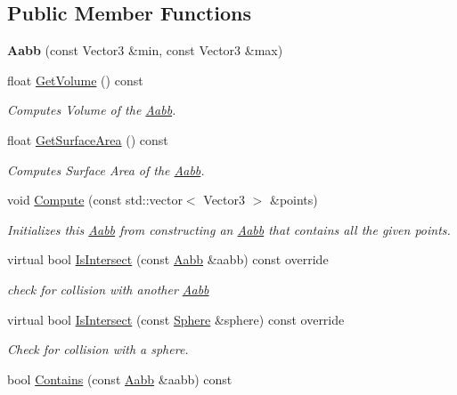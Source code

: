 \subsection*{Public Member Functions}
\begin{DoxyCompactItemize}
\item 
\mbox{\label{classAabb_a03899715c47e17287f251dc325ebd477}} 
{\bfseries Aabb} (const Vector3 \&min, const Vector3 \&max)
\item 
float \hyperlink{classAabb_ad0f21e16f7be2c42839b0cb025eeed9f}{Get\+Volume} () const
\begin{DoxyCompactList}\small\item\em Computes Volume of the \hyperlink{classAabb}{Aabb}. \end{DoxyCompactList}\item 
float \hyperlink{classAabb_aa5c6fea4dcb0a7f9640a72b1babfe192}{Get\+Surface\+Area} () const
\begin{DoxyCompactList}\small\item\em Computes Surface Area of the \hyperlink{classAabb}{Aabb}. \end{DoxyCompactList}\item 
void \hyperlink{classAabb_a57f19da16237a3e73ba246bd9a20cb9f}{Compute} (const std\+::vector$<$ Vector3 $>$ \&points)
\begin{DoxyCompactList}\small\item\em Initializes this \hyperlink{classAabb}{Aabb} from constructing an \hyperlink{classAabb}{Aabb} that contains all the given points. \end{DoxyCompactList}\item 
virtual bool \hyperlink{classAabb_a98746a9bae7409bd1cf3734125b62da6}{Is\+Intersect} (const \hyperlink{classAabb}{Aabb} \&aabb) const override
\begin{DoxyCompactList}\small\item\em check for collision with another \hyperlink{classAabb}{Aabb} \end{DoxyCompactList}\item 
virtual bool \hyperlink{classAabb_af08568647c234b68334892b20885084a}{Is\+Intersect} (const \hyperlink{classSphere}{Sphere} \&sphere) const override
\begin{DoxyCompactList}\small\item\em Check for collision with a sphere. \end{DoxyCompactList}\item 
bool \hyperlink{classAabb_ac3cca862f5ccbdf7e3aed736476fd9ea}{Contains} (const \hyperlink{classAabb}{Aabb} \&aabb) const

\end{DoxyCompactItemize}

